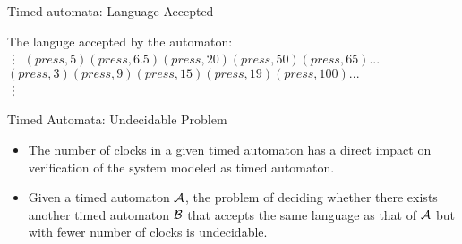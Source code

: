 \documentclass[10pt]{beamer}
\theoremstyle{plain}
\theoremstyle{definition}
\begin{document}
\begin{frame}{Timed automata: Language Accepted}
	\begin{figure}[!t]
	\begin{center}

	\end{center}
	\end{figure}
	The languge accepted by the automaton: \\
		\vdots
		$(press, 5) (press, 6.5) (press, 20) (press, 50) (press, 65) ...$
		$(press, 3) (press, 9) (press, 15) (press, 19) (press, 100) ...$\\
		\vdots
\end{frame}

\begin{frame}{Timed Automata: Undecidable Problem}
	\begin{itemize}
		\item The number of clocks in a given timed automaton has a direct impact on verification of the system modeled as timed automaton.
		\item Given a timed automaton $\cal A$, the problem of deciding whether there exists another timed automaton $\cal B$ that accepts the same language as that of $\cal A$ but with fewer number of clocks is undecidable.
		
	\end{itemize}
	\vspace{0.5cm}
	
\end{frame}
\end{document}
